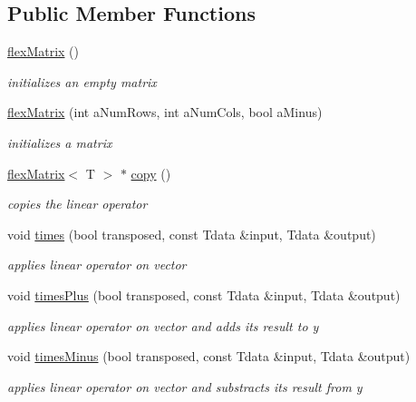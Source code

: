\subsection*{Public Member Functions}
\begin{DoxyCompactItemize}
\item 
\mbox{\label{classflex_matrix_a435c0b9173f4b27ae6a81f3fbfebc428}} 
\hyperlink{classflex_matrix_a435c0b9173f4b27ae6a81f3fbfebc428}{flex\+Matrix} ()
\begin{DoxyCompactList}\small\item\em initializes an empty matrix \end{DoxyCompactList}\item 
\hyperlink{classflex_matrix_a47ca204d9c79473c830e7582a7ff4e87}{flex\+Matrix} (int a\+Num\+Rows, int a\+Num\+Cols, bool a\+Minus)
\begin{DoxyCompactList}\small\item\em initializes a matrix \end{DoxyCompactList}\item 
\hyperlink{classflex_matrix}{flex\+Matrix}$<$ T $>$ $\ast$ \hyperlink{classflex_matrix_a4e9d53b8d606511759decbf52628203a}{copy} ()
\begin{DoxyCompactList}\small\item\em copies the linear operator \end{DoxyCompactList}\item 
void \hyperlink{classflex_matrix_ac7e95eed2025202b252d804034b923b6}{times} (bool transposed, const Tdata \&input, Tdata \&output)
\begin{DoxyCompactList}\small\item\em applies linear operator on vector \end{DoxyCompactList}\item 
void \hyperlink{classflex_matrix_a758c7520961d79e64bdf59d8ddb6bfb6}{times\+Plus} (bool transposed, const Tdata \&input, Tdata \&output)
\begin{DoxyCompactList}\small\item\em applies linear operator on vector and adds its result to y \end{DoxyCompactList}\item 
void \hyperlink{classflex_matrix_a100e59f7261d95eabc28fd9056d2b77b}{times\+Minus} (bool transposed, const Tdata \&input, Tdata \&output)
\begin{DoxyCompactList}\small\item\em applies linear operator on vector and substracts its result from y \end{DoxyCompactList}\item 

\end{DoxyCompactItemize}
